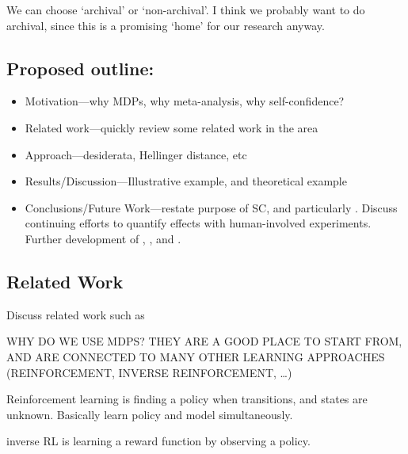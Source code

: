 We can choose `archival' or `non-archival'. I think we probably want to do archival, since this is a promising `home' for our research anyway.


\subsection{Proposed outline:}

\begin{itemize}
    \item Motivation---why MDPs, why meta-analysis, why self-confidence? 
    \item Related work---quickly review some related work in the area 
    \item Approach---desiderata, Hellinger distance, etc
    \item Results/Discussion---Illustrative example, and theoretical example
    \item Conclusions/Future Work---restate purpose of SC, and particularly \xQ. Discuss continuing efforts to quantify effects with human-involved experiments. Further development of \xH, \xI, and \xM.
\end{itemize}

\subsection{Related Work}
    Discuss related work such as

    WHY DO WE USE MDPS? THEY ARE A GOOD PLACE TO START FROM, AND ARE CONNECTED TO MANY OTHER LEARNING APPROACHES (REINFORCEMENT, INVERSE REINFORCEMENT, \ldots)

    Reinforcement learning is finding a policy when transitions, and states are unknown. Basically learn policy and model simultaneously.

    inverse RL is learning a reward function by observing a policy.

